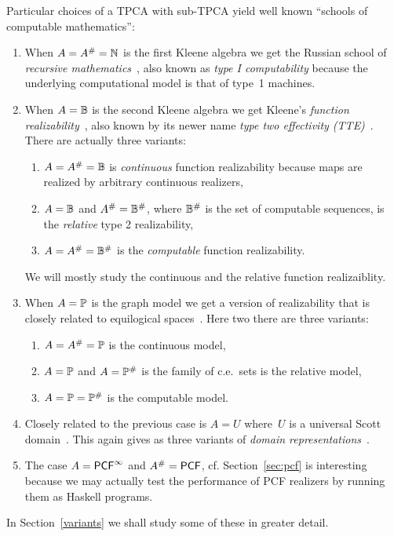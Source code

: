 Particular choices of a TPCA with sub-TPCA yield well known ``schools
of computable mathematics'':
%
\begin{enumerate}
\item When $A = A^{\#} = \mathbb{N}$ is the first Kleene algebra we get the
  Russian school of \emph{recursive
    mathematics}~\cite{recursive-math}, also known as \emph{type I
    computability} because the underlying computational model is that
  of type~1 machines.
\item When $A = \mathbb{B}$ is the second Kleene algebra we get Kleene's
  \emph{function realizability}~\cite{KleeneSC:fouim}, also known by
  its newer name \emph{type two effectivity (TTE)}~\cite{tte}. There
  are actually three variants:
  \begin{enumerate}
  \item $A = A^{\#} = \mathbb{B}$ is \emph{continuous} function
    realizability because maps are realized by arbitrary continuous
    realizers,
  \item $A = \mathbb{B}$ and $A^{\#} = \mathbb{B}^{\#}$, where
    $\mathbb{B}^{\#}$ is the set of computable sequences, is the
    \emph{relative} type 2 realizability,
  \item $A = A^{\#} = \mathbb{B}^{\#}$ is the \emph{computable}
    function realizability.
  \end{enumerate}
  We will mostly study the continuous and the relative function
  realizaiblity.
\item When $A = \mathbb{P}$ is the graph model we get a version of
  realizability that is closely related to equilogical
  spaces~\cite{BauerA:equs}. Here two there are three variants:
  \begin{enumerate}
  \item $A = A^{\#} = \mathbb{P}$ is the continuous model,
  \item $A = \mathbb{P}$ and $A = \mathbb{P}^{\#}$ is the family of
    c.e.~sets is the relative model,
  \item $A = \mathbb{P} = \mathbb{P}^{\#}$ is the computable model.
  \end{enumerate}
\item Closely related to the previous case is $A = U$ where~$U$ is a
  universal Scott domain~\cite{GunterScott}. This again gives as three
  variants of \emph{domain representations}~\cite{Bla97,Bla97a}.
\item The case $A = \mathsf{PCF}^\infty$ and $A^{\#} = \mathsf{PCF}$, cf.
  Section~\ref{sec:pcf} is interesting because we may actually test
  the performance of PCF realizers by running them as Haskell
  programs.
\end{enumerate}
%
In Section~\ref{variants} we shall study some of these in greater
detail.





